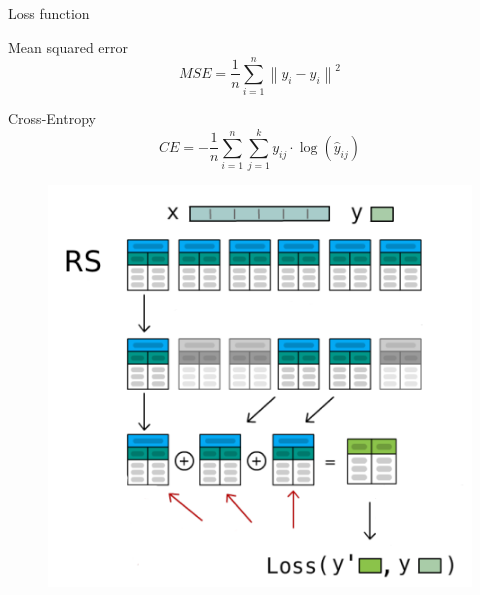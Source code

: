 \documentclass[aspectratio=169]{beamer}
\begin{document}

\begin{frame}{Loss function}
    \begin{block}{Mean squared error}
        \begin{equation}
MSE = \frac{1}{n} \sum_{i=1}^{n} \left\| y_i - \hat{y}_i \right\|^2
        \end{equation}
    \end{block}
    \begin{block}{{\rm Cross-Entropy}}
        \begin{equation}
        CE = - \frac{1}{n} \sum_{i=1}^{n} \sum_{j=1}^{k} y_{ij} \cdot \log(\hat{y}_{ij})
        \end{equation}
    
    \end{block}
        
\end{frame}
\begin{figure}
    \centering
    \includegraphics[width=0.55\linewidth]{dst_ill_eng.png}
\end{figure}
\end{document}
